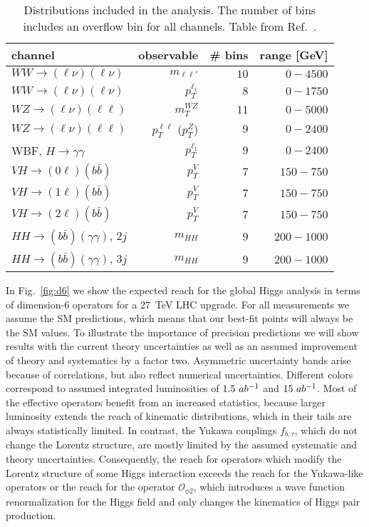 \begin{table}[t!]
\centering
\begin{tabular}{lrrr}
\toprule
channel  & observable & \# bins & range [GeV] \\
\midrule
$WW \rightarrow (\ell \nu)(\ell \nu)$          & $m_{\ell\ell'}$ & $10$ & $0-4500$\\
$WW \rightarrow (\ell \nu)(\ell \nu)$          & $p_T^{\ell_1}$ & $8$ & $0-1750$\\
$WZ \rightarrow (\ell \nu)(\ell \ell)$          & $m_T^{WZ}$ & $11$ & $0-5000$\\
$WZ \rightarrow (\ell \nu)(\ell \ell)$          & $p_T^{\ell\ell}$ ($p_T^Z$) & $9$ & $0-2400$\\
WBF, $H\rightarrow \gamma\gamma$          & $p_T^{\ell_1}$ & $9$ & $0-2400$\\
$VH \rightarrow (0\ell) (b \bar{b})$ & $p_T^V$ & $7$ & $150-750$\\
$VH \rightarrow (1\ell) (b \bar{b})$ & $p_T^V$ & $7$ & $150-750$\\
$VH \rightarrow (2\ell) (b \bar{b})$ & $p_T^V$ & $7$ & $150-750$\\
$HH \rightarrow (b \bar{b}) (\gamma \gamma)$, $2j$ & $m_{HH}$ & $9$ & $200-1000$ \\
$HH \rightarrow (b \bar{b}) (\gamma \gamma)$, $3j$ & $m_{HH}$ & $9$ & $200-1000$ \\
\bottomrule
\end{tabular}
\caption{Distributions included in the analysis. The number of bins
includes an overflow bin for all channels. Table from Ref.~\cite{Biekotter:2018jzu}.}
\label{tab:distr}
\end{table}


In Fig.~\ref{fig:d6} we show the expected reach for the global 
Higgs analysis in terms of dimension-6 operators for a 27~TeV LHC upgrade. 
For all measurements we assume the SM predictions,
which means that our best-fit points will always be the SM values.
To illustrate the importance of precision predictions we
will show results with the current theory uncertainties as well as an
assumed improvement of theory and systematics by a factor two.
Asymmetric
uncertainty bands arise because of correlations, but also reflect
numerical uncertainties.  Different colors correspond to assumed
integrated luminosities of $1.5~ab^{-1}$ and $15~ab^{-1}$.  
Most of the effective operators
benefit from an increased statistics, because larger luminosity
extends the reach of kinematic distributions, which in their tails are
always statistically limited. In contrast, the Yukawa couplings
$f_{b,\tau}$, which do not change the Lorentz structure, are mostly
limited by the assumed systematic and theory uncertainties.
Consequently, the reach for operators which modify the Lorentz
structure of some Higgs interaction exceeds the reach for the
Yukawa-like operators or the reach for the operator $\mathcal{O}_{\phi 2}$,
which introduces a wave function renormalization for the Higgs field
and only changes the kinematics of Higgs pair production. 


